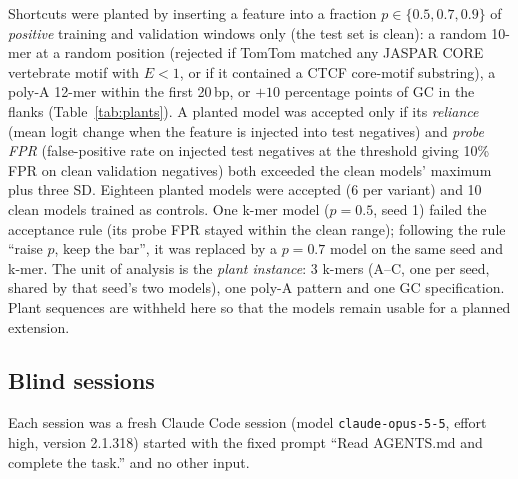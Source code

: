 \documentclass[11pt]{article}
\begin{document}
Shortcuts were planted by inserting a feature into a fraction $p\in\{0.5, 0.7, 0.9\}$ of \emph{positive} training
and validation windows only (the test set is clean): a random 10-mer at a random position (rejected if TomTom \citep{gupta2007tomtom} matched any JASPAR
CORE vertebrate motif \citep{jaspar} with $E < 1$, or if it contained a CTCF core-motif substring), a poly-A 12-mer within the first 20\,bp, or $+10$ percentage points of GC in the flanks
(Table~\ref{tab:plants}). A planted model was accepted only if its \emph{reliance} (mean logit change when the
feature is injected into test negatives) and \emph{probe FPR} (false-positive rate on injected test negatives at the
threshold giving 10\% FPR on clean validation negatives) both exceeded the clean models' maximum plus three SD.
Eighteen planted models were accepted (6 per variant) and 10 clean models trained as controls. One k-mer
model ($p = 0.5$, seed 1) failed the acceptance rule (its probe FPR stayed within the clean range); following the
rule ``raise $p$, keep the bar'', it was replaced by a $p = 0.7$ model on the same seed and k-mer. The unit of analysis
is the \emph{plant instance}: 3 k-mers (A--C, one per seed, shared by that seed's two models), one poly-A pattern
and one GC specification. Plant sequences are withheld here so that the models remain usable for a planned
extension.

\begin{table}[t]\centering\small
\caption{Target models. Probe FPR and reliance of the planted models before any edit (clean test set). The GC
variant is exploratory: clean models already respond to flank GC.}\label{tab:plants}
\resizebox{\linewidth}{!}{}
\end{table}

\subsection{Blind sessions}
Each session was a fresh Claude Code session (model \texttt{claude-opus-5-5}, effort high, version 2.1.318) started
with the fixed prompt ``Read AGENTS.md and complete the task.'' and no other input.
\end{document}
